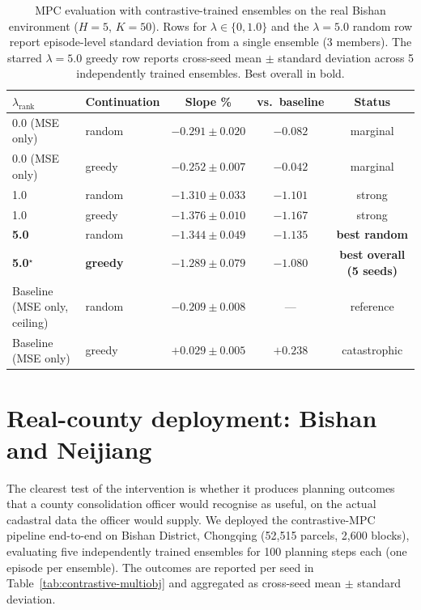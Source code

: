 \documentclass[11pt]{article}
\begin{document}
\begin{table}[htbp]
\centering
\small
\caption{MPC evaluation with contrastive-trained ensembles on the real Bishan environment ($H{=}5$, $K{=}50$). Rows for $\lambda \in \{0, 1.0\}$ and the $\lambda{=}5.0$ random row report episode-level standard deviation from a single ensemble (3 members). The starred $\lambda{=}5.0$ greedy row reports cross-seed mean $\pm$ standard deviation across 5 independently trained ensembles. Best overall in bold.}
\label{tab:contrastive-mpc}
\begin{tabular}{llccc}
\toprule
$\lambda_{\text{rank}}$ & Continuation & Slope \% & vs.\ baseline & Status \\
\midrule
0.0 (MSE only) & random & $-0.291 \pm 0.020$ & $-0.082$ & marginal \\
0.0 (MSE only) & greedy  & $-0.252 \pm 0.007$ & $-0.042$ & marginal \\
\midrule
1.0 & random & $-1.310 \pm 0.033$ & $-1.101$ & strong \\
1.0 & greedy & $-1.376 \pm 0.010$ & $-1.167$ & strong \\
\midrule
\textbf{5.0} & random & $\mathbf{-1.344 \pm 0.049}$ & $-1.135$ & \textbf{best random} \\
\textbf{5.0}$^\star$ & \textbf{greedy} & $\mathbf{-1.289 \pm 0.079}$ & $\mathbf{-1.080}$ & \textbf{best overall (5 seeds)} \\
\midrule
Baseline (MSE only, ceiling) & random & $-0.209 \pm 0.008$ & --- & reference \\
Baseline (MSE only)          & greedy & $+0.029 \pm 0.005$ & $+0.238$ & catastrophic \\
\bottomrule
\end{tabular}
\end{table}

\section{Real-county deployment: Bishan and Neijiang}\label{sec:counties}

The clearest test of the intervention is whether it produces planning outcomes that a county consolidation officer would recognise as useful, on the actual cadastral data the officer would supply. We deployed the contrastive-MPC pipeline end-to-end on Bishan District, Chongqing (52{,}515 parcels, 2{,}600 blocks), evaluating five independently trained ensembles for 100 planning steps each (one episode per ensemble). The outcomes are reported per seed in Table~\ref{tab:contrastive-multiobj} and aggregated as cross-seed mean $\pm$ standard deviation.
\end{document}
